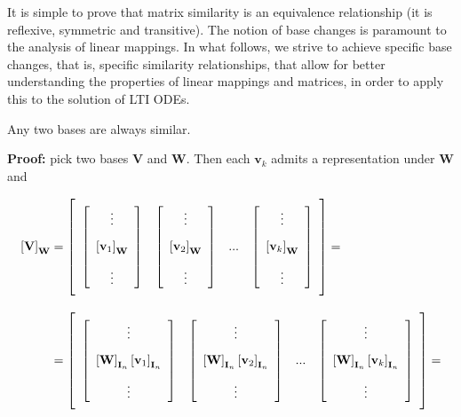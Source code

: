 	It is simple to prove that matrix similarity is an equivalence relationship (it is reflexive, symmetric and transitive). The notion of base changes is paramount to the analysis of linear mappings. In what follows, we strive to achieve specific base changes, that is, specific similarity relationships, that allow for better understanding the properties of linear mappings and matrices, in order to apply this to the solution of LTI ODEs.

\begin{theorem}\label{theo:bases_similarity} %
	Any two bases are always similar.
\end{theorem}
\noindent\textbf{Proof:} pick two bases $\mathbf{V}$ and $\mathbf{W}$. Then each $\mathbf{v}_k$ admits a representation under $\mathbf{W}$ and

\begin{align}
	\left[\mathbf{V}\right]_{\mathbf{W}} &= \left[\raisebox{15mm}{} \begin{array}{cccc} \left[\begin{array}{c} \vdots \\[3mm] \left[\mathbf{v}_1\right]_{\mathbf{W}} \\[3mm] \vdots \end{array}\right] & \left[\begin{array}{c} \vdots \\[3mm] \left[\mathbf{v}_2\right]_{\mathbf{W}} \\[3mm] \vdots \end{array}\right] & ... & \left[\begin{array}{c} \vdots \\[3mm] \left[\mathbf{v}_k\right]_{\mathbf{W}} \\[3mm] \vdots \end{array}\right]\end{array}\right] = \nonumber\\[3mm]
	&=\left[\raisebox{15mm}{} \begin{array}{cccc} \left[\begin{array}{c} \vdots \\[3mm] \left[\mathbf{W}\right]_{\mathbf{I}_n} \left[\mathbf{v}_1\right]_{\mathbf{I}_n} \\[3mm] \vdots \end{array}\right] & \left[\begin{array}{c} \vdots \\[3mm] \left[\mathbf{W}\right]_{\mathbf{I}_n}\left[\mathbf{v}_2\right]_{\mathbf{I}_n} \\[3mm] \vdots \end{array}\right] & ... & \left[\begin{array}{c} \vdots \\[3mm] \left[\mathbf{W}\right]_{\mathbf{I}_n}\left[\mathbf{v}_k\right]_{\mathbf{I}_n} \\[3mm] \vdots \end{array}\right]\end{array}\right] = \nonumber\\[3mm]

\end{align}
